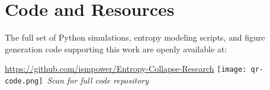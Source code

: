 \documentclass[12pt]{article}
\begin{document}
\section*{Code and Resources}
The full set of Python simulations, entropy modeling scripts, and figure generation code supporting this work are openly available at:
\begin{center}
\url{https://github.com/ismpower/Entropy-Collapse-Research}
\texttt{[image: qr-code.png]}\
\textit{Scan for full code repository}\
\end{center}\n
\end{document}
